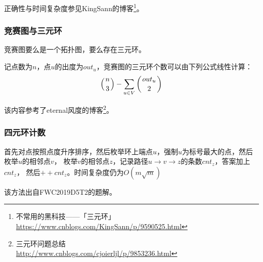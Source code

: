 正确性与时间复杂度参见KingSann的博客\footnote{
	不常用的黑科技——「三元环」
	\url{https://www.cnblogs.com/KingSann/p/9590525.html}
}。

\subsubsection{竞赛图与三元环}
\begin{theorem}
	竞赛图要么是一个拓扑图，要么存在三元环。
\end{theorem}

记点数为$n$，点$u$的出度为$out_u$，竞赛图的三元环个数可以由下列公式线性计算：
\begin{displaymath}
	\left(n \atop 3\right)-\sum_{u\in V}{\left(out_u \atop 2\right)}
\end{displaymath}

该内容参考了eternal风度的博客\footnote{
	三元环问题总结\\
	\url{http://www.cnblogs.com/cjoierljl/p/9853236.html}
}。
\subsubsection{四元环计数}
首先对点按照点度升序排序，然后枚举环上端点$u$，强制$u$为标号最大的点，然后枚举$u$的相邻点$v$，
枚举$v$的相邻点$z$，记录路径$u\rightarrow v \rightarrow z$的条数$cnt_z$，答案加上$cnt_z$，
然后$++cnt_z$。时间复杂度仍为$O(m\sqrt{m})$

该方法出自FWC2019D5T2的题解。
